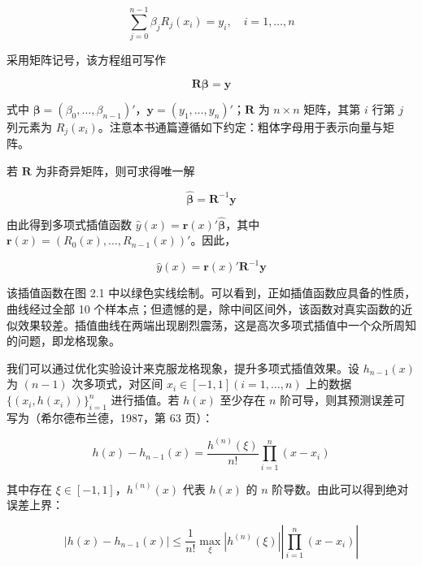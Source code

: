 \documentclass{ctexart}
\begin{document}
\begin{equation*}
\sum_{j=0}^{n-1}\beta_jR_j(x_i)=y_i,\quad i=1,\dots,n
\end{equation*}

采用矩阵记号，该方程组可写作

\begin{equation*}
\boldsymbol{R}\boldsymbol{\beta}=\boldsymbol{y}
\end{equation*}

式中 $\boldsymbol{\beta}=(\beta_0,\dots,\beta_{n-1})'$，$\boldsymbol{y}=(y_1,\dots,y_n)'$；$\boldsymbol{R}$ 为 $n\times n$ 矩阵，其第 $i$ 行第 $j$ 列元素为 $R_j(x_i)$。注意本书通篇遵循如下约定：粗体字母用于表示向量与矩阵。

若 $\boldsymbol{R}$ 为非奇异矩阵，则可求得唯一解

\begin{equation*}
\widehat{\boldsymbol{\beta}}=\boldsymbol{R}^{-1}\boldsymbol{y}
\end{equation*}

由此得到多项式插值函数 $\widehat{y}(x)=\boldsymbol{r}(x)'\widehat{\boldsymbol{\beta}}$，其中 $\boldsymbol{r}(x)=(R_0(x),\dots,R_{n-1}(x))'$。因此，

\begin{equation*}
\widehat{y}(x)=\boldsymbol{r}(x)'\boldsymbol{R}^{-1}\boldsymbol{y}
\tag{2.4}
\end{equation*}

该插值函数在图 2.1 中以绿色实线绘制。可以看到，正如插值函数应具备的性质，曲线经过全部 10 个样本点；但遗憾的是，除中间区间外，该函数对真实函数的近似效果较差。插值曲线在两端出现剧烈震荡，这是高次多项式插值中一个众所周知的问题，即龙格现象。

我们可以通过优化实验设计来克服龙格现象，提升多项式插值效果。设 $h_{n-1}(x)$ 为 $(n-1)$ 次多项式，对区间 $x_i\in[-1,1](i=1,\dots,n)$ 上的数据 $\{(x_i,h(x_i))\}_{i=1}^n$ 进行插值。若 $h(x)$ 至少存在 $n$ 阶可导，则其预测误差可写为（希尔德布兰德，1987，第 63 页）：

\begin{equation*}
h(x)-h_{n-1}(x)=\frac{h^{(n)}(\xi)}{n!}\prod_{i=1}^n(x-x_i)
\end{equation*}

其中存在 $\xi\in[-1,1]$，$h^{(n)}(x)$ 代表 $h(x)$ 的 $n$ 阶导数。由此可以得到绝对误差上界：

\begin{equation*}
|h(x)-h_{n-1}(x)|\le\frac{1}{n!}\max_{\xi}\left|h^{(n)}(\xi)\right|\left|\prod_{i=1}^n(x-x_i)\right|
\end{equation*}
\end{document}
